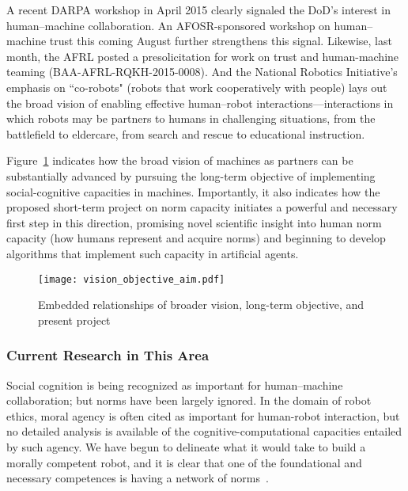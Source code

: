\documentclass[12pt]{article}
\begin{document}
A recent DARPA workshop in April 2015 clearly signaled the DoD's
interest in human--machine collaboration.  An AFOSR-sponsored workshop
on human--machine trust this coming August further strengthens this
signal. Likewise, last month, the AFRL posted a presolicitation for work on 
trust and human-machine teaming (BAA-AFRL-RQKH-2015-0008). And  
the National Robotics Initiative's emphasis on ``co-robots" (robots that work 
cooperatively with people) lays out the broad vision of enabling effective
human--robot interactions---interactions in which robots may be
partners to humans in challenging situations, from the battlefield to
eldercare, from search and rescue to educational instruction.

Figure~\ref{fig:visionobjective} indicates how the broad vision
of machines as partners can be substantially advanced by pursuing the
long-term objective of implementing social-cognitive capacities in 
machines.  Importantly, it also indicates how the proposed short-term 
project on norm capacity initiates a powerful and necessary first step in this 
direction, promising novel scientific insight into human norm capacity (how 
humans represent and acquire norms) and beginning to develop algorithms 
that implement such capacity in artificial agents.

\begin{figure}[h!]
 \centering
\texttt{[image: vision\_objective\_aim.pdf]}
  \caption{\small Embedded relationships of broader vision, long-term objective, and 
present project}
  \label{fig:visionobjective}
  \end{figure}
  

\subsubsection*{Current Research in This Area}
  \label{sec:OtherResearch}

Social cognition is being recognized as important for human--machine collaboration; but norms have been largely ignored.  
In the domain of robot ethics, moral agency is often cited as important for human-robot interaction, but no detailed analysis is available of the 
cognitive-computational capacities entailed by such agency.  We have begun to delineate what it would take to build a morally competent robot, and it is clear that one of the foundational and necessary competences is having a network of norms~\citep{malle_ieee14}. 
\end{document}
